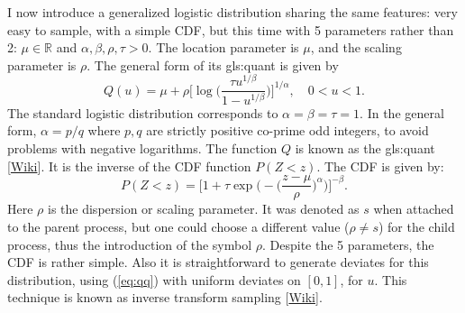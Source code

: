 \documentclass[10pt]{article}
\begin{document}
I now introduce a \textcolor{index}{generalized logistic distribution} sharing the same features: very easy to sample, with a simple CDF, but this time with 5 parameters rather than 2: $\mu\in\mathbb{R}$ and $\alpha,\beta,\rho,\tau>0$. The location parameter is $\mu$, and the scaling parameter is $\rho$. The general form of its 
\gls{gls:quant} is given by
\begin{equation}
Q(u)=\mu+\rho\Big[\log \Big(\frac{\tau u^{1/\beta}}{1-u^{1/\beta}}\Big)\Big]^{1/\alpha}, \quad 0<u<1. \label{eq:qq}
\end{equation}
The standard \textcolor{index}{logistic distribution} corresponds to $\alpha=\beta=\tau=1$. In the general form, $\alpha=p/q$ where $p,q$ are strictly positive co-prime odd integers, to avoid problems with negative logarithms. The function $Q$ is known 
as the \gls{gls:quant} [\href{https://en.wikipedia.org/wiki/Quantile_function}{Wiki}]. It is the inverse of the CDF function $P(Z<z)$. The CDF is given by:
\begin{equation}
P(Z<z) = \Big[1+\tau \exp\Big(-\Big(\frac{z-\mu}{\rho}\Big)^\alpha\Big) \Big]^{-\beta}. \label{eq:gld1}
\end{equation}
Here $\rho$ is the dispersion or scaling parameter. It was denoted as $s$ when attached to the parent process, but one could choose a different value ($\rho\neq s$) for the child process, thus the introduction of the symbol $\rho$.  Despite the 5 parameters, the CDF is rather simple. Also it is straightforward to generate deviates for this distribution, using (\ref{eq:qq}) with uniform deviates on $[0, 1]$, for $u$. This technique is known as 
\textcolor{index}{inverse transform sampling} [\href{https://en.wikipedia.org/wiki/Inverse_transform_sampling}{Wiki}].
\end{document}
